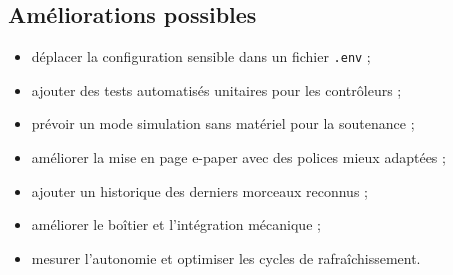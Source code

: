\subsection{Améliorations possibles}

\begin{itemize}
    \item déplacer la configuration sensible dans un fichier \texttt{.env} ;
    \item ajouter des tests automatisés unitaires pour les contrôleurs ;
    \item prévoir un mode simulation sans matériel pour la soutenance ;
    \item améliorer la mise en page e-paper avec des polices mieux adaptées ;
    \item ajouter un historique des derniers morceaux reconnus ;
    \item améliorer le boîtier et l'intégration mécanique ;
    \item mesurer l'autonomie et optimiser les cycles de rafraîchissement.
\end{itemize}
